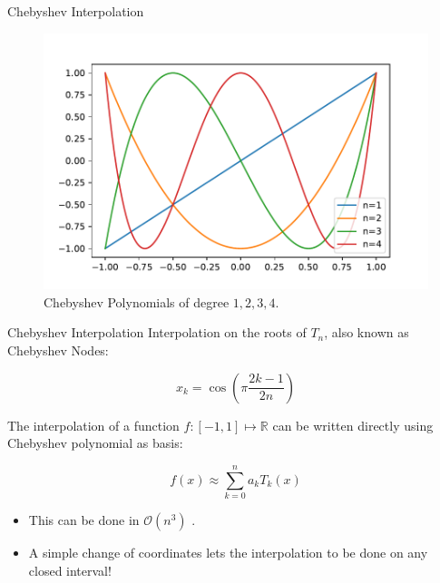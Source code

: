 \documentclass{beamer}
\newcommand{\R}{\mathbb{R}}
\newcommand{\bigO}{\mathscr{O}}
\begin{document}
\begin{frame}{Chebyshev Interpolation}
\begin{figure}
	\centering
	
	\includegraphics[scale=.6]{chebpoly}
	\caption{Chebyshev Polynomials of degree $1, 2, 3, 4$.}
\end{figure}
\end{frame}

\begin{frame}{Chebyshev Interpolation}
	Interpolation on the roots of $T_n$, also known as Chebyshev Nodes:
	
	\begin{equation*}
		x_k = \cos\left(\pi\frac{2k - 1}{2n}\right)
	\end{equation*}
	
	The interpolation of a function $f : [-1, 1] \mapsto \R$ can be written directly using Chebyshev polynomial as basis:
	
	\begin{equation*}
	f(x) \approx \sum_{k=0}^{n} a_k T_k(x)
	\end{equation*}
	
	\begin{itemize}
		\item This can be done in $\bigO(n^3)$ \cite{boyd:2013}.
		\item A simple change of coordinates lets the interpolation to be done on any closed interval!
	\end{itemize}
\end{frame}
\end{document}
